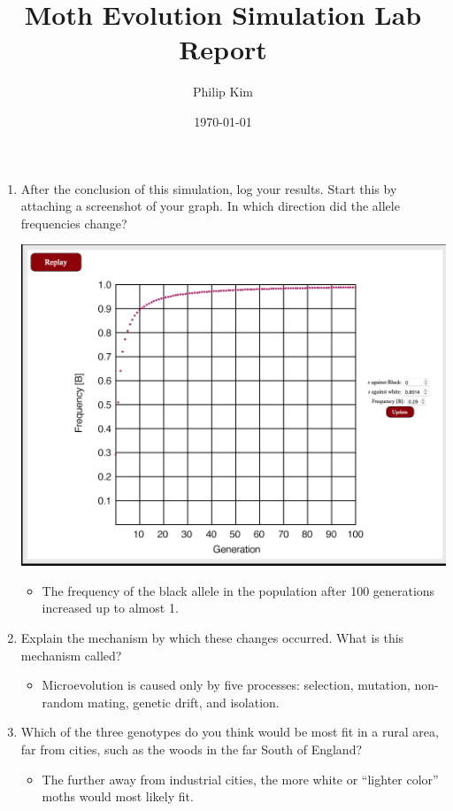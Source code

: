 \documentclass{article}
\title{Moth Evolution Simulation Lab Report}
\author{Philip Kim}
\date{\today}
\begin{document}
\maketitle
\begin{enumerate}
  \item After the conclusion of this simulation, log your results. Start this by attaching a screenshot of your graph. In which direction did the allele frequencies change?
  \begin{center}
    \includegraphics[scale=0.3]{white.png}
  \end{center}
  \begin{itemize}
    \item The frequency of the black allele in the population after 100 generations increased up to almost 1.
  \end{itemize}
  \item Explain the mechanism by which these changes occurred. What is this mechanism called?
  \begin{itemize}
    \item Microevolution is caused only by five processes: selection, mutation, non-random mating, genetic drift, and isolation.
  \end{itemize}
  \item Which of the three genotypes do you think would be most fit in a rural area, far from cities, such as the woods in the far South of England?
  \begin{itemize}
    \item The further away from industrial cities, the more white or ``lighter color'' moths would most likely fit.

\end{itemize}
\end{enumerate}
\end{document}
